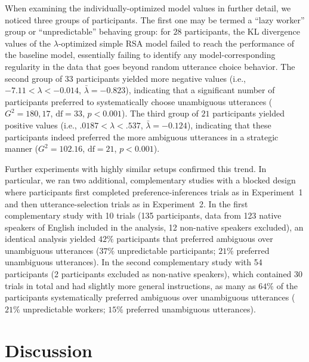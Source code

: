 \documentclass[11pt,a4paper]{article}
\begin{document}
When examining the individually-optimized model values in further detail, we noticed three groups of participants. 
The first one may be termed a ``lazy worker'' group or ``unpredictable'' behaving group:
for $28$ participants, the KL divergence values of the $\lambda$-optimized simple RSA model failed to reach the performance of the baseline model, essentially failing to identify any model-corresponding regularity in the data that goes beyond random utterance choice behavior.
The second group of $33$ participants yielded more negative values (i.e., $-7.11<\lambda<-0.014$, $\bar{\lambda}=-0.823$), indicating that a significant number of participants preferred to systematically choose unambiguous utterances ($G^2=180,17$, $\textrm{df}=33$, $p<0.001$). 
The third group of $21$ participants yielded positive values (i.e., $.0187<\lambda<.537$, $\bar{\lambda}=-0.124$), indicating that these participants indeed preferred the more ambiguous utterances in a strategic manner ($G^2=102.16$, $\textrm{df}=21$, $p<0.001$).


Further experiments with highly similar setups confirmed this trend.
In particular, we ran two additional, complementary studies with a blocked design where participants first completed preference-inferences trials as in Experiment~1 and then utterance-selection trials as in Experiment~2. 
In the first complementary study with 10 trials (135 participants, data from 123 native speakers of English included in the analysis, 12 non-native speakers excluded), an identical analysis yielded $42\%$ participants that preferred ambiguous over unambiguous utterances ($37\%$ unpredictable participants; $21\%$ preferred unambiguous utterances). 
In the second complementary study with 54 participants (2 participants excluded as non-native speakers), which contained 30 trials in total and had slightly more general instructions, as many as $64\%$ of the participants systematically preferred ambiguous over unambiguous utterances ($21\%$ unpredictable workers; $15\%$ preferred unambiguous utterances). 



\section{Discussion} \label{discussion}

\end{document}

